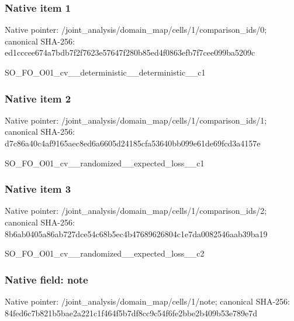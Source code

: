 \documentclass[10pt,a4paper]{article}
\begin{document}
\subsubsection{Native item 1}
Native pointer: /joint\_\allowbreak{}analysis/domain\_\allowbreak{}map/cells/1/comparison\_\allowbreak{}ids/0; canonical SHA-256: ed1cccee674a7bdb7f2f7623e57647f280b85ed4f0863efb7f7cee099ba5209c

\begingroup\raggedright\sloppy SO\_\allowbreak{}FO\_\allowbreak{}O01\_\allowbreak{}cv\_\allowbreak{}\_\allowbreak{}deterministic\_\allowbreak{}\_\allowbreak{}deterministic\_\allowbreak{}\_\allowbreak{}c1\par\endgroup

\subsubsection{Native item 2}
Native pointer: /joint\_\allowbreak{}analysis/domain\_\allowbreak{}map/cells/1/comparison\_\allowbreak{}ids/1; canonical SHA-256: d7c86a40c4af9165aec8ed6a6605d24185cfa53640bb099e61de69fcd3a4157e

\begingroup\raggedright\sloppy SO\_\allowbreak{}FO\_\allowbreak{}O01\_\allowbreak{}cv\_\allowbreak{}\_\allowbreak{}randomized\_\allowbreak{}\_\allowbreak{}expected\_\allowbreak{}loss\_\allowbreak{}\_\allowbreak{}c1\par\endgroup

\subsubsection{Native item 3}
Native pointer: /joint\_\allowbreak{}analysis/domain\_\allowbreak{}map/cells/1/comparison\_\allowbreak{}ids/2; canonical SHA-256: 8b6ab0405a86ab727dce54c68b5ec4b47689626804c1e7da0082546aab39ba19

\begingroup\raggedright\sloppy SO\_\allowbreak{}FO\_\allowbreak{}O01\_\allowbreak{}cv\_\allowbreak{}\_\allowbreak{}randomized\_\allowbreak{}\_\allowbreak{}expected\_\allowbreak{}loss\_\allowbreak{}\_\allowbreak{}c2\par\endgroup

\subsubsection{Native field: note}
Native pointer: /joint\_\allowbreak{}analysis/domain\_\allowbreak{}map/cells/1/note; canonical SHA-256: 84fed6c7b821b5bae2a221c1f464f5b7df8cc9c54f6fe2bbe2b409b53e789e7d
\end{document}
